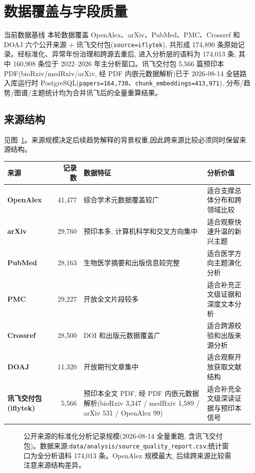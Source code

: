 \section{数据覆盖与字段质量}

\begin{reportbox}{当前数据基线}
本轮数据覆盖 OpenAlex、arXiv、PubMed、PMC、Crossref 和 DOAJ 六个公开来源 + 讯飞交付包(\texttt{source=iflytek}), 共形成 174,890 条原始记录。经标准化、异常年份治理和跨源去重后, 进入分析层的语料为 174,013 条, 其中 160,908 条位于 2022--2026 年主分析窗口。讯飞交付包 5{,}566 篇预印本 PDF(bioRxiv/medRxiv/arXiv, 经 PDF 内嵌元数据解析)已于 2026-08-14 全链路入库运行时 PostgreSQL(\texttt{papers=164{,}730}、\texttt{chunk\_embeddings=413{,}971}), 分布/趋势/图谱/主题统计均为合并讯飞后的全量重算结果。
\end{reportbox}

\subsection{来源结构}
见图~\ref{fig:data-source-records}。来源规模决定后续趋势解释的背景权重,因此跨来源比较必须同时保留来源结构。

\begin{tableblock}
\begin{tabularx}{\textwidth}{>{\bfseries}p{28mm}r X X}
\toprule
来源 & 记录数 & 数据特征 & 分析价值 \\
\midrule
OpenAlex & 41,477 & 综合学术元数据覆盖较广 & 适合支撑总体分布和跨领域比较 \\
arXiv & 29,760 & 预印本多, 计算机科学和交叉方向集中 & 适合观察快速升温的新兴主题 \\
PubMed & 28,163 & 生物医学摘要和出版信息较完整 & 适合医学方向主题演化分析 \\
PMC & 29,227 & 开放全文片段较多 & 适合补充正文级证据和深度文本分析 \\
Crossref & 28,500 & DOI 和出版元数据覆盖广 & 适合跨源校验和出版来源分析 \\
DOAJ & 11,320 & 开放期刊文章集中 & 适合观察开放获取文献结构 \\
讯飞交付包(iflytek) & 5,566 & 预印本全文 PDF, 经 PDF 内嵌元数据解析(bioRxiv 3,347 / medRxiv 1,589 / arXiv 531 / OpenAlex 99) & 适合补充全文级深读证据与预印本信号 \\
\bottomrule
\end{tabularx}
\end{tableblock}

\begin{figure}[!htbp]
  \centering
  \caption{公开来源的标准化分析记录规模(2026-08-14 全量重跑, 含讯飞交付包)。数据来源:\texttt{data/analysis/source\_quality\_report.csv};统计窗口为全分析语料 174,013 条。OpenAlex 规模最大, 后续跨来源比较需注意来源结构差异。}
  \label{fig:data-source-records}
\end{figure}

